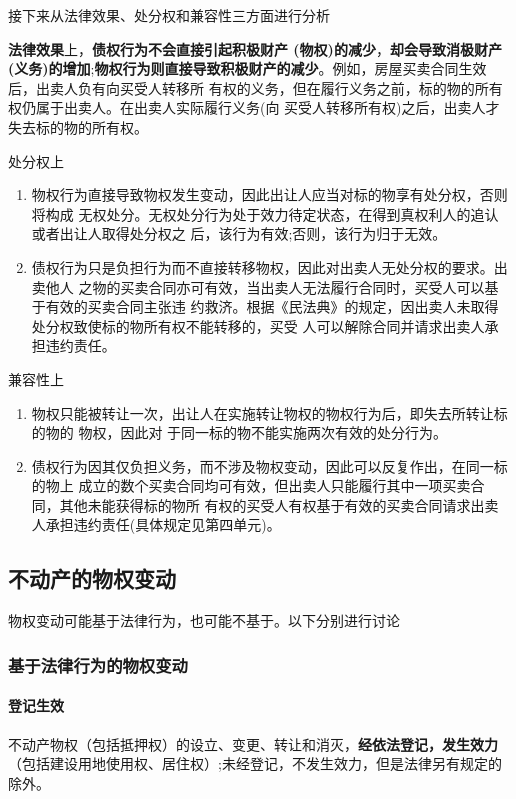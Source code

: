 \documentclass[UTF8,12pt]{ctexart}
\numberwithin{equation}{section} %
\numberwithin{figure}{section}
\numberwithin{table}{section}
\begin{document}
	接下来从法律效果、处分权和兼容性三方面进行分析
	
	\textbf{法律效果}上，\textbf{债权行为不会直接引起积极财产 (物权)的减少}，\textbf{却会导致消极财产(义务)的增加};\textbf{物权行为则直接导致积极财产的减少}。例如，房屋买卖合同生效后，出卖人负有向买受人转移所 有权的义务，但在履行义务之前，标的物的所有权仍属于出卖人。在出卖人实际履行义务(向 买受人转移所有权)之后，出卖人才失去标的物的所有权。
	
	处分权上
	\begin{enumerate}
		\item 物权行为直接导致物权发生变动，因此出让人应当对标的物享有处分权，否则将构成 无权处分。无权处分行为处于效力待定状态，在得到真权利人的追认或者出让人取得处分权之 后，该行为有效;否则，该行为归于无效。
		
		\item 债权行为只是负担行为而不直接转移物权，因此对出卖人无处分权的要求。出卖他人 之物的买卖合同亦可有效，当出卖人无法履行合同时，买受人可以基于有效的买卖合同主张违 约救济。根据《民法典》的规定，因出卖人未取得处分权致使标的物所有权不能转移的，买受 人可以解除合同并请求出卖人承担违约责任。
	\end{enumerate}
	
	
	兼容性上
	\begin{enumerate}
		\item 物权只能被转让一次，出让人在实施转让物权的物权行为后，即失去所转让标的物的 物权，因此对 于同一标的物不能实施两次有效的处分行为。
		
		\item 债权行为因其仅负担义务，而不涉及物权变动，因此可以反复作出，在同一标的物上 成立的数个买卖合同均可有效，但出卖人只能履行其中一项买卖合同，其他未能获得标的物所 有权的买受人有权基于有效的买卖合同请求出卖人承担违约责任(具体规定见第四单元)。
	\end{enumerate}
	
	\subsection{不动产的物权变动}
	物权变动可能基于法律行为，也可能不基于。以下分别进行讨论
	
	\subsubsection{基于法律行为的物权变动}
	\paragraph{登记生效} 
	不动产物权（包括抵押权）的设立、变更、转让和消灭，\textbf{经依法登记，发生效力}（包括建设用地使用权、居住权）;未经登记，不发生效力，但是法律另有规定的除外。
\end{document}
